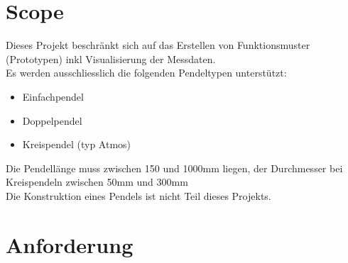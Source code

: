 \section{Scope}
Dieses Projekt beschränkt sich auf das Erstellen von Funktionsmuster (Prototypen) inkl Visualisierung der Messdaten.\\
Es werden ausschliesslich die folgenden Pendeltypen unterstützt:
\begin{itemize}
	\item Einfachpendel
	\item Doppelpendel
	\item Kreispendel (typ Atmos)
\end{itemize}
Die Pendellänge muss zwischen 150 und 1000mm liegen, der Durchmesser bei Kreispendeln zwischen 50mm und 300mm\\
Die Konstruktion eines Pendels ist nicht Teil dieses Projekts.
\section{Anforderung}

